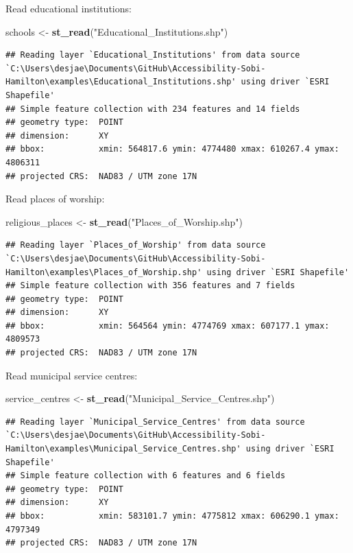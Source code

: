 \documentclass[
]{article}
\newenvironment{Shaded}{\begin{snugshade}}{\end{snugshade}}
\newcommand{\KeywordTok}[1]{\textcolor[rgb]{0.13,0.29,0.53}{\textbf{#1}}}
\newcommand{\NormalTok}[1]{#1}
\newcommand{\StringTok}[1]{\textcolor[rgb]{0.31,0.60,0.02}{#1}}
\begin{document}
Read educational institutions:

\begin{Shaded}
\begin{Highlighting}[]
\NormalTok{schools <-}\StringTok{ }\KeywordTok{st_read}\NormalTok{(}\StringTok{"Educational_Institutions.shp"}\NormalTok{)}
\end{Highlighting}
\end{Shaded}

\begin{verbatim}
## Reading layer `Educational_Institutions' from data source `C:\Users\desjae\Documents\GitHub\Accessibility-Sobi-Hamilton\examples\Educational_Institutions.shp' using driver `ESRI Shapefile'
## Simple feature collection with 234 features and 14 fields
## geometry type:  POINT
## dimension:      XY
## bbox:           xmin: 564817.6 ymin: 4774480 xmax: 610267.4 ymax: 4806311
## projected CRS:  NAD83 / UTM zone 17N
\end{verbatim}

Read places of worship:

\begin{Shaded}
\begin{Highlighting}[]
\NormalTok{religious_places <-}\StringTok{ }\KeywordTok{st_read}\NormalTok{(}\StringTok{"Places_of_Worship.shp"}\NormalTok{)}
\end{Highlighting}
\end{Shaded}

\begin{verbatim}
## Reading layer `Places_of_Worship' from data source `C:\Users\desjae\Documents\GitHub\Accessibility-Sobi-Hamilton\examples\Places_of_Worship.shp' using driver `ESRI Shapefile'
## Simple feature collection with 356 features and 7 fields
## geometry type:  POINT
## dimension:      XY
## bbox:           xmin: 564564 ymin: 4774769 xmax: 607177.1 ymax: 4809573
## projected CRS:  NAD83 / UTM zone 17N
\end{verbatim}

Read municipal service centres:

\begin{Shaded}
\begin{Highlighting}[]
\NormalTok{service_centres <-}\StringTok{ }\KeywordTok{st_read}\NormalTok{(}\StringTok{"Municipal_Service_Centres.shp"}\NormalTok{)}
\end{Highlighting}
\end{Shaded}

\begin{verbatim}
## Reading layer `Municipal_Service_Centres' from data source `C:\Users\desjae\Documents\GitHub\Accessibility-Sobi-Hamilton\examples\Municipal_Service_Centres.shp' using driver `ESRI Shapefile'
## Simple feature collection with 6 features and 6 fields
## geometry type:  POINT
## dimension:      XY
## bbox:           xmin: 583101.7 ymin: 4775812 xmax: 606290.1 ymax: 4797349
## projected CRS:  NAD83 / UTM zone 17N
\end{verbatim}
\end{document}
